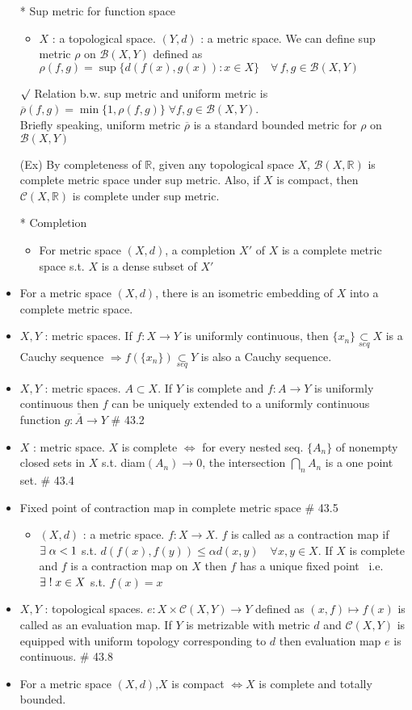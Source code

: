 \documentclass[12pt]{article}
\newcommand{\rmk}{$\surd$}
\newcommand{\spone}{\hspace{0.1cm}}
\newcommand{\Real}{\mathbb{R}}
\newcommand{\B}{\mathcal{B}}
\newcommand{\C}{\mathcal{C}}
\newcommand{\seq}{\underset{seq}{\subset}}
\newcommand{\cl}{\overline}
\newcommand{\exist}{\exists\spone}
\begin{document}
\begin{itemize}
    \item[*]Sup metric for function space
    \begin{itemize}
        \item $X$ : a topological space. $(Y,d)$ : a metric space. We can define sup metric $\rho$ on $\B(X,Y)$ defined as $\rho(f,g)=\sup\{d(f(x), g(x)) : x \in X\} \quad \forall \, f,g \in \B(X,Y) $\;
    \end{itemize}
    \item[\rmk] Relation b.w. sup metric and uniform metric is $\overline{\rho}(f,g)=\min\{1, \rho(f,g)\} \; \forall f,g\in \B(X,Y)$. \\ Briefly speaking, uniform metric $\overline{\rho}$ is a standard bounded metric for $\rho$ on $\B(X,Y)$
    \item[(Ex)] By completeness of $\Real$, given any topological space $X$, $\B(X,\Real)$ is complete metric space under sup metric. Also, if $X$ is compact, then $\C(X, \Real)$ is complete under sup metric.
    \item[*] Completion
    \begin{itemize}
        \item For metric space $(X,d)$, a completion $X'$ of $X$ is a complete metric space s.t. $X$ is a dense subset of $X'$
    \end{itemize}
    \item For a metric space $(X,d)$, there is an isometric embedding of $X$ into a complete metric space.
    \item $X, Y$ : metric spaces. If $f:X\rightarrow Y$ is uniformly continuous, then $\{x_n\}\seq X$ is a Cauchy sequence $\Rightarrow f(\{x_n\})\seq Y$ is also a Cauchy sequence. 
    \item $X, Y$ : metric spaces. $A\subset X$. If $Y$ is complete and $f: A\rightarrow Y$ is uniformly continuous  then $f$ can be uniquely extended to a uniformly continuous function $g : \cl{A}\rightarrow Y$ \quad \# 43.2
    \item $X$ : metric space. $X$ is complete $\Leftrightarrow$ for every nested seq. $\{A_n\}$ of nonempty closed sets in $X$ s.t. diam$(A_n)\rightarrow 0$, the intersection $\bigcap_{n}A_n$ is a one point set. \quad \# 43.4
    \item Fixed point of contraction map in complete metric space \quad \# 43.5
	\begin{itemize}
		\item $(X,d)$ : a metric space. $f: X\rightarrow X$. $f$ is called as a contraction map if $\exist \alpha<1 $ s.t. $d(f(x),f(y))\leq \alpha d(x,y) \quad \forall x,y\in X$. If $X$ is complete and $f$ is a contraction map on $X$ then $f$ has a unique fixed point \, i.e. \, $\exist ! \;x\in X$ s.t. $f(x)=x$
	\end{itemize}
	\item $X,Y$ : topological spaces. $e: X\times \C(X,Y) \rightarrow Y$ defined as $(x,f)\mapsto f(x)$ is called as an evaluation map. If $Y$ is metrizable with metric $d$ and $\C(X,Y)$ is equipped with uniform topology corresponding to $d$ then evaluation map $e$ is continuous. \quad \# 43.8
	\item For a metric space $(X,d)$,\quad $X$ is compact $\Leftrightarrow X$ is complete and totally bounded.
\end{itemize}
\end{document}
